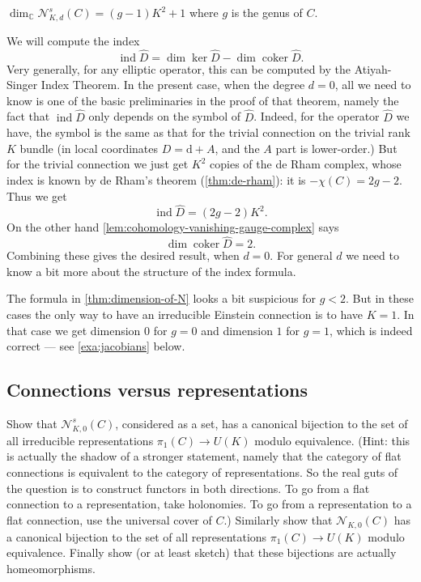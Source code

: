 \documentclass[12pt,letterpaper,reqno]{article}
\numberwithin{equation}{section}
\newcommand{\cN}{\ensuremath{\mathcal N}}
\newcommand{\C}{\ensuremath{\mathbb C}}
\newcommand{\de}{\mathrm{d}}
\DeclareMathOperator{\ind}{ind}
\DeclareMathOperator{\coker}{coker}
\newcommand{\fixme}[1]{{\color{orange}{[#1]}}}
\begin{document}
\begin{thm}[Dimension of $\cN^s_{K,d}(C)$] \label{thm:dimension-of-N}
$\dim_\C \cN^s_{K,d}(C) = (g-1)K^2+1$ where $g$ is the genus of $C$.
\end{thm}
\begin{pf} We will compute the index
\begin{equation}
  \ind \hat{D} = \dim \ker \hat{D} - \dim \coker \hat{D}.
\end{equation}
Very generally, for any elliptic operator, this can be
computed by the Atiyah-Singer Index Theorem. In the present
case, when the degree $d=0$,
all we need to know is one of the basic
preliminaries in the proof of that theorem, namely the fact that
$\ind \hat{D}$ only depends on the symbol of $\hat{D}$.
Indeed, for the operator $\hat{D}$ we have, the symbol
is the same as that for the trivial connection on
the trivial rank $K$ bundle (in local coordinates $D = \de + A$,
and the $A$ part is lower-order.) But for the trivial
connection we just get $K^2$ copies of the de Rham
complex, whose index is known by de Rham's theorem
(\autoref{thm:de-rham}): it is $-\chi(C) = 2g-2$. Thus we get
\begin{equation}
  \ind \hat{D} = (2g-2) K^2.
\end{equation}
On the other hand \autoref{lem:cohomology-vanishing-gauge-complex}
says
\begin{equation}
  \dim \coker \hat{D} = 2.
\end{equation}
Combining these gives the desired result, when $d=0$.
For general $d$ we need to know a bit more about the
structure of the index formula. \fixme{...}
\end{pf}

The formula in \autoref{thm:dimension-of-N} looks a bit
suspicious for $g < 2$. But in these cases
the only way to have an irreducible Einstein
connection is to have $K=1$. In that case we get dimension
$0$ for $g=0$ and dimension $1$ for $g=1$, which is indeed
correct --- see \autoref{exa:jacobians} below.


\subsection{Connections versus representations}

\begin{exercise} \label{exc:connections-vs-representations}
Show that $\cN_{K,0}^s(C)$, considered as a set,
has a canonical bijection to the set of all irreducible representations
$\pi_1(C) \to U(K)$ modulo equivalence. (Hint: this is actually the shadow
of a stronger statement, namely that the category of flat connections is
equivalent to the category of representations. So the real guts of the
question is to construct functors in both directions. To go from a flat
connection to a representation, take holonomies. To go from
a representation to a flat connection, use the universal cover of $C$.)
Similarly show that $\cN_{K,0}(C)$ has a canonical bijection to
the set of all representations
$\pi_1(C) \to U(K)$ modulo equivalence.
Finally show (or at least sketch) that
these bijections are actually homeomorphisms.
\end{exercise}
\end{document}
